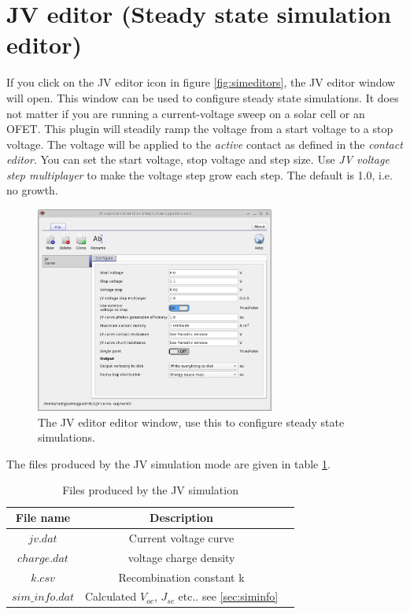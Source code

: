 \newpage
\section{JV editor (Steady state simulation editor)}
If you click on the JV editor icon in figure \ref{fig:simeditors}, the JV editor window will open. This window can be used to configure steady state simulations. It does not matter if you are running a current-voltage sweep on a solar cell or an OFET.  This plugin will steadily ramp the voltage from a start voltage to a stop voltage.  The voltage will be applied to the \emph{active} contact as defined in the \emph{contact editor}.  You can set the start voltage, stop voltage and step size.  Use \emph{JV voltage step multiplayer} to make the voltage step grow each step.  The default is 1.0, i.e. no growth.

\begin{figure}[H]
\centering
\includegraphics[width=0.7\textwidth,height=0.6\textwidth]{./images/jv_editor.png}
\caption{The JV editor editor window, use this to configure steady state simulations.}
\label{fig:jvcurveeditor}
\end{figure}

The files produced by the JV simulation mode are given in table \ref{tab:jv_output}.

\begin{table}[H]
\begin{center}
\begin{tabular}{ |c|c|c| } 
 \hline
	File name 			& 	Description  \\ 
 \hline
	$jv.dat$ 			&	Current voltage curve \\ 
	$charge.dat$ 		&	voltage charge density\\ 
	$k.csv$ 			&	Recombination constant k\\ 
	$sim\_info.dat$ 	&	Calculated $V_{oc}$, $J_{sc}$ etc.. see \ref{sec:siminfo}   \\

 \hline
\end{tabular}
\caption{Files produced by the JV simulation}
\label{tab:jv_output}
\end{center}
\end{table}


